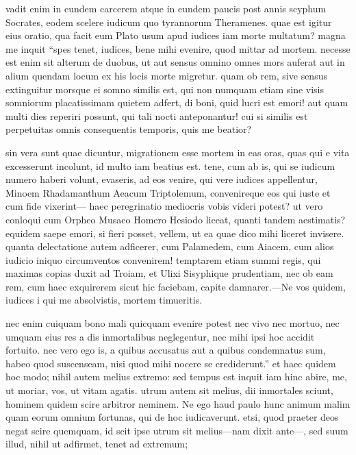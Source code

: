  vadit enim in eundem carcerem atque in eundem paucis post annis scyphum Socrates, eodem scelere iudicum quo tyrannorum Theramenes. quae est igitur eius oratio, qua facit eum Plato usum apud iudices iam morte multatum? magna me inquit ``spes tenet, iudices, bene mihi evenire, quod mittar ad mortem. necesse est enim sit alterum de duobus, ut aut sensus omnino omnes mors auferat aut in alium quendam locum ex his locis morte migretur. quam ob rem, sive sensus extinguitur morsque ei somno similis est, qui non numquam etiam sine visis somniorum placatissimam quietem adfert, di boni, quid lucri est emori! aut quam multi dies reperiri possunt, qui tali nocti anteponantur! cui si similis est perpetuitas omnis consequentis temporis, quis me beatior?

 sin vera sunt quae dicuntur, migrationem esse mortem in eas oras, quas qui e vita excesserunt incolunt, id multo iam beatius est. tene, cum ab is, qui se iudicum numero haberi volunt, evaseris, ad eos venire, qui vere iudices appellentur, Minoem Rhadamanthum Aeacum Triptolemum, convenireque eos qui iuste et cum fide vixerint— haec peregrinatio mediocris vobis videri potest? ut vero conloqui cum Orpheo Musaeo Homero Hesiodo liceat, quanti tandem aestimatis? equidem saepe emori, si fieri posset, vellem, ut ea quae dico mihi liceret invisere. quanta delectatione autem adficerer, cum Palamedem, cum Aiacem, cum alios iudicio iniquo circumventos convenirem! temptarem etiam summi regis, qui maximas copias duxit ad Troiam, et Ulixi Sisyphique prudentiam, nec ob eam rem, cum haec exquirerem sicut hic faciebam, capite damnarer.—Ne vos quidem, iudices i qui me absolvistis, mortem timueritis.

 nec enim cuiquam bono mali quicquam evenire potest nec vivo nec mortuo, nec umquam eius res a dis inmortalibus neglegentur, nec mihi ipsi hoc accidit fortuito. nec vero ego is, a quibus accusatus aut a quibus condemnatus sum, habeo quod suscenseam, nisi quod mihi nocere se crediderunt.'' et haec quidem hoc modo; nihil autem melius extremo: sed tempus est inquit iam hinc abire, me, ut moriar, vos, ut vitam agatis. utrum autem sit melius, dii inmortales sciunt, hominem quidem scire arbitror neminem. Ne ego haud paulo hunc animum malim quam eorum omnium fortunas, qui de hoc iudicaverunt. etsi, quod praeter deos negat scire quemquam, id scit ipse utrum sit melius—nam dixit ante—, sed suum illud, nihil ut adfirmet, tenet ad extremum;

